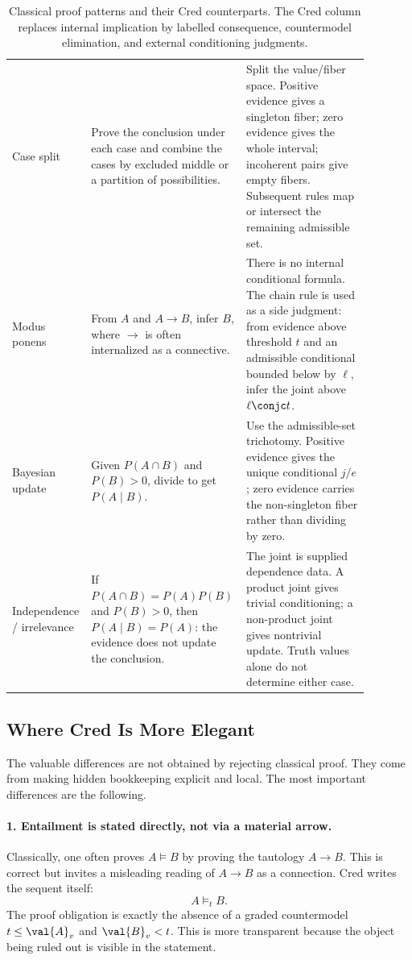 \begin{table}[h]
\begin{tabular}{@{}p{0.20\linewidth}p{0.34\linewidth}p{0.34\linewidth}@{}}
\addlinespace
Case split &
Prove the conclusion under each case and combine the cases by excluded
middle or a partition of possibilities. &
Split the value/fiber space.  Positive evidence gives a singleton
fiber; zero evidence gives the whole interval; incoherent pairs give
empty fibers.  Subsequent rules map or intersect the remaining
admissible set. \\
\addlinespace
Modus ponens &
From $A$ and $A\to B$, infer $B$, where $\to$ is often internalized as
a connective. &
There is no internal conditional formula.  The chain rule is used as a
side judgment: from evidence above threshold $t$ and an admissible
conditional bounded below by $\ell$, infer the joint above
$\ell\conjc t$. \\
\addlinespace
Bayesian update &
Given $P(A\cap B)$ and $P(B)>0$, divide to get $P(A\mid B)$. &
Use the admissible-set trichotomy.  Positive evidence gives the unique
conditional $j/e$; zero evidence carries the non-singleton fiber rather
than dividing by zero. \\
\addlinespace
Independence / irrelevance &
If $P(A\cap B)=P(A)P(B)$ and $P(B)>0$, then $P(A\mid B)=P(A)$: the
evidence does not update the conclusion. &
The joint is supplied dependence data.  A product joint gives trivial
conditioning; a non-product joint gives nontrivial update.  Truth values
alone do not determine either case. \\
\bottomrule
\end{tabular}
\caption{Classical proof patterns and their Cred counterparts.  The
Cred column replaces internal implication by labelled consequence,
countermodel elimination, and external conditioning judgments.}
\label{tab:proof-patterns}
\end{table}

\subsection{Where Cred Is More Elegant}

The valuable differences are not obtained by rejecting classical proof.
They come from making hidden bookkeeping explicit and local.  The most
important differences are the following.

\paragraph{1. Entailment is stated directly, not via a material arrow.}
Classically, one often proves $A\models B$ by proving the tautology
$A\to B$.  This is correct but invites a misleading reading of $A\to B$
as a connection.  Cred writes the sequent itself:
\[
  A\models_t B.
\]
The proof obligation is exactly the absence of a graded countermodel
$t\le\val{A}_v$ and $\val{B}_v<t$.  This is more transparent because the
object being ruled out is visible in the statement.


